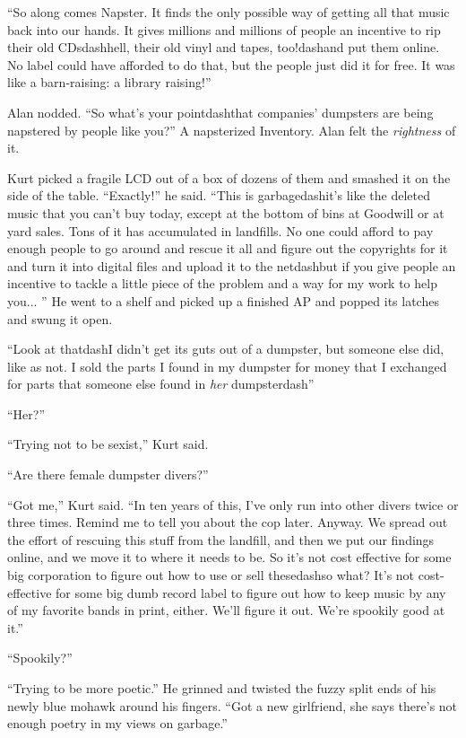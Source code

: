 ``So along comes Napster.  It finds the only possible way of getting
all that music back into our hands.  It gives millions and millions of
people an incentive to rip their old CDsdash{}hell, their old vinyl and
tapes, too!dash{}and put them online.  No label could have afforded to do
that, but the people just did it for free.  It was like a
barn-raising:  a library raising!''

Alan nodded.  ``So what's your pointdash{}that companies' dumpsters are
being napstered by people like you?'' A napsterized Inventory.  Alan
felt the \textit{rightness} of it.

Kurt picked a fragile LCD out of a box of dozens of them and smashed
it on the side of the table.  ``Exactly!'' he said.  ``This is
garbagedash{}it's like the deleted music that you can't buy today, except
at the bottom of bins at Goodwill or at yard sales.  Tons of it has
accumulated in landfills.  No one could afford to pay enough people to
go around and rescue it all and figure out the copyrights for it and
turn it into digital files and upload it to the netdash{}but if you give
people an incentive to tackle a little piece of the problem and a way
for my work to help you...  '' He went to a shelf and picked up a
finished AP and popped its latches and swung it open.

``Look at thatdash{}I didn't get its guts out of a dumpster, but someone
else did, like as not.  I sold the parts I found in my dumpster for
money that I exchanged for parts that someone else found in
\textit{her} dumpsterdash{}''

``Her?''

``Trying not to be sexist,'' Kurt said.

``Are there female dumpster divers?''

``Got me,'' Kurt said.  ``In ten years of this, I've only run into
other divers twice or three times.  Remind me to tell you about the
cop later.  Anyway.  We spread out the effort of rescuing this stuff
from the landfill, and then we put our findings online, and we move it
to where it needs to be.  So it's not cost effective for some big
corporation to figure out how to use or sell thesedash{}so what?  It's
not cost-effective for some big dumb record label to figure out how to
keep music by any of my favorite bands in print, either.  We'll figure
it out.  We're spookily good at it.''

``Spookily?''

``Trying to be more poetic.'' He grinned and twisted the fuzzy split
ends of his newly blue mohawk around his fingers.  ``Got a new
girlfriend, she says there's not enough poetry in my views on
garbage.''

